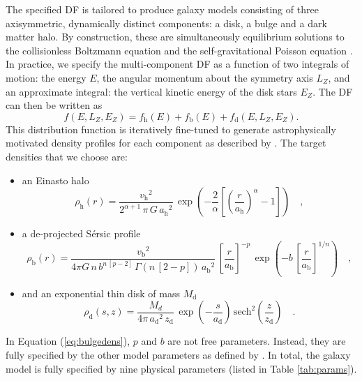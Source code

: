 \documentclass[preprint,12pt]{aastex}
\newcommand{\tab}[1]{Table \ref{tab:#1}}
\newcommand{\eqlabel}[1]{\label{eq:#1}}
\newcommand{\eq}[1]{Equation (\ref{eq:#1})}
\newcommand{\df}{f}
\newcommand{\dfs}[1]{\df_\mathrm{#1}}
\newcommand{\dfhalo}{\dfs{\halo}}
\newcommand{\dfbulge}{\dfs{\bulge}}
\newcommand{\dfdisk}{\dfs{\disk}}
\newcommand{\E}{\ensuremath{E}}
\newcommand{\Lz}{\ensuremath{L_Z}}
\newcommand{\Ez}{\ensuremath{E_Z}}
\newcommand{\halo}{\mathrm{h}}
\newcommand{\bulge}{\mathrm{b}}
\newcommand{\disk}{\mathrm{d}}
\newcommand{\mass}{\ensuremath{M}}
\newcommand{\ah}{\ensuremath{a_\halo}}
\newcommand{\vh}{\ensuremath{v_\halo}}
\newcommand{\nh}{\ensuremath{\alpha}}
\newcommand{\Md}{\ensuremath{\mass_\disk}}
\newcommand{\Rd}{\ensuremath{a_\disk}}
\newcommand{\vb}{\ensuremath{v_\bulge}}
\newcommand{\Rb}{\ensuremath{a_\bulge}}
\begin{document}
The specified DF is tailored to produce galaxy models consisting of
three axisymmetric, dynamically distinct components: a disk, a bulge and
a dark matter halo. By construction, these are simultaneously equilibrium
solutions to the collisionless Boltzmann equation and the self-gravitational
Poisson equation \citep{Binney:2008}. In practice, we specify the
multi-component DF as a function of two integrals of motion: the energy \E,
the angular momentum about the symmetry axis \Lz, and an approximate
integral: the vertical kinetic energy of the disk stars \Ez. The DF can then
be written as
\begin{equation}
    \eqlabel{df1}
    \df (\E,\Lz,\Ez) = \dfhalo (\E) + \dfbulge (\E) + \dfdisk (\E,\Lz,\Ez).
\end{equation}
This distribution function is iteratively fine-tuned to generate
astrophysically motivated density profiles for each component as described
by \citet{Widrow:2008}. The target densities that we choose are:
\begin{itemize}
    \item{an Einasto halo \citep{Merritt:2006,Navarro:2010}
        \begin{equation}
            \rho_\halo (r) = \frac{\vh^2}{2^{\nh+1} \, \pi \, G \,\ah^2}
                \, \exp \left ( -\frac{2}{\nh}
                \left [ \left (
                    \frac{r}{\ah} \right )^{\nh} - 1 \right ] \right ) \quad ,
        \end{equation}
    }
    \item{a de-projected S\'ersic profile
    \citep{Prugniel:1997,Terzic:2005}
        \begin{equation}\eqlabel{bulgedens}
            \rho_\bulge (r) = \frac{\vb^2}{4\pi G\,n\,b^{n\,[p-2]}\,
                \Gamma (n \, [2-p]) \, \Rb^2}
                \, \left [ \frac{r}{\Rb} \right ]^{-p} \,
                \exp \left ( -b \, \left [ \frac{r}{\Rb} \right ]^{1/n}
                \right ) \quad ,
        \end{equation}
    }
    \item{and an exponential thin disk of mass \Md
        \begin{equation}
            \rho_\disk (s,z) = \frac{M_d}{4\pi \, \Rd^2\,z_\disk} \,
                \exp \left (- \frac{s}{\Rd} \right )
                \, \mathrm{sech}^2 \left ( \frac{z}{z_\disk} \right ) \quad .
        \end{equation}
    }
\end{itemize}
In \eq{bulgedens}, $p$ and $b$ are not free parameters. Instead, they are
fully specified by the other model parameters as defined by
\citet{Terzic:2005}. In total, the galaxy model is fully specified by nine
physical parameters (listed in \tab{params}).
\end{document}
